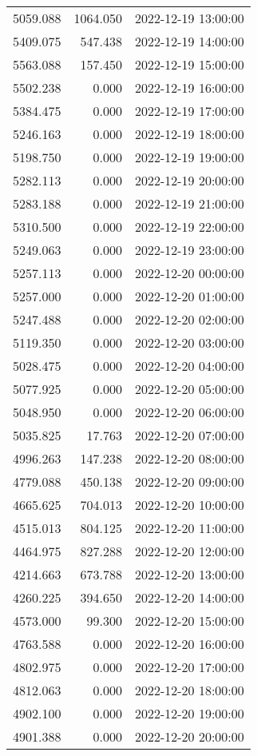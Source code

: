 \documentclass[
]{article}
\begin{document}
\begin{longtable}[]{@{}rrl@{}}
5059.088 & 1064.050 & 2022-12-19 13:00:00 \\
5409.075 & 547.438 & 2022-12-19 14:00:00 \\
5563.088 & 157.450 & 2022-12-19 15:00:00 \\
5502.238 & 0.000 & 2022-12-19 16:00:00 \\
5384.475 & 0.000 & 2022-12-19 17:00:00 \\
5246.163 & 0.000 & 2022-12-19 18:00:00 \\
5198.750 & 0.000 & 2022-12-19 19:00:00 \\
5282.113 & 0.000 & 2022-12-19 20:00:00 \\
5283.188 & 0.000 & 2022-12-19 21:00:00 \\
5310.500 & 0.000 & 2022-12-19 22:00:00 \\
5249.063 & 0.000 & 2022-12-19 23:00:00 \\
5257.113 & 0.000 & 2022-12-20 00:00:00 \\
5257.000 & 0.000 & 2022-12-20 01:00:00 \\
5247.488 & 0.000 & 2022-12-20 02:00:00 \\
5119.350 & 0.000 & 2022-12-20 03:00:00 \\
5028.475 & 0.000 & 2022-12-20 04:00:00 \\
5077.925 & 0.000 & 2022-12-20 05:00:00 \\
5048.950 & 0.000 & 2022-12-20 06:00:00 \\
5035.825 & 17.763 & 2022-12-20 07:00:00 \\
4996.263 & 147.238 & 2022-12-20 08:00:00 \\
4779.088 & 450.138 & 2022-12-20 09:00:00 \\
4665.625 & 704.013 & 2022-12-20 10:00:00 \\
4515.013 & 804.125 & 2022-12-20 11:00:00 \\
4464.975 & 827.288 & 2022-12-20 12:00:00 \\
4214.663 & 673.788 & 2022-12-20 13:00:00 \\
4260.225 & 394.650 & 2022-12-20 14:00:00 \\
4573.000 & 99.300 & 2022-12-20 15:00:00 \\
4763.588 & 0.000 & 2022-12-20 16:00:00 \\
4802.975 & 0.000 & 2022-12-20 17:00:00 \\
4812.063 & 0.000 & 2022-12-20 18:00:00 \\
4902.100 & 0.000 & 2022-12-20 19:00:00 \\
4901.388 & 0.000 & 2022-12-20 20:00:00 \\

\end{longtable}
\end{document}
